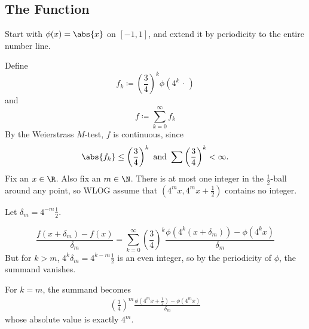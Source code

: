 \subsection{The  Function} \label{sec:the_______function}

Start with $\phi(x) = \abs{x}$ on $[-1, 1]$, and extend it by periodicity
to the entire number line.

Define \[
    f_k \coloneq \left(\frac{3}{4}\right)^k \phi(4^k \,\cdot\,)
\] and \[
    f \coloneq \sum_{k=0}^{\infty} f_k
\]
By the Weierstrass $M$-test, $f$ is continuous, since \[
    \abs{f_k} \le \left(\frac{3}{4}\right)^k
        \text{ and }
    \sum \left(\frac34\right)^k < \infty.
\]
Fix an $x \in \R$.
Also fix an $m \in \N$.
There is at most one integer in the $\frac12$-ball around any point, so WLOG
assume that $(4^m x, 4^m x + \frac12)$ contains no integer.

Let $\delta_m = 4^{-m} \frac12$.

\[
    \frac{f(x + \delta_m) - f(x)}{\delta_m}
    = \sum_{k=0}^\infty \left(\frac{3}{4}\right)^k
        \frac{\phi(4^k (x + \delta_m)) - \phi(4^k x)}{\delta_m}
\]
But for $k > m$, $4^k \delta_m = 4^{k-m} \frac{1}{2}$ is an even integer,
so by the periodicity of $\phi$, the summand vanishes.

For $k = m$, the summand becomes \begin{align*}
    \left(\frac{3}{4}\right)^m \frac{\phi(4^m x + \frac12) - \phi(4^m x)}{\delta_m}
\end{align*}
whose absolute value is exactly $4^m$.
